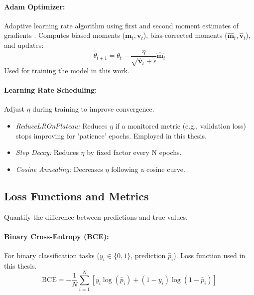 \begin{appendices}
  \paragraph{Adam Optimizer:}
  Adaptive learning rate algorithm using first and second moment estimates of gradients \autocite{kingma2014adam}. Computes biased moments (\( \bm{m}_t, \bm{v}_t \)), bias-corrected moments (\( \hat{\bm{m}}_t, \hat{\bm{v}}_t \)), and updates:
  \begin{equation}
    \theta_{t+1} = \theta_t - \frac{\eta}{\sqrt{\hat{\bm{v}}_t} + \epsilon} \hat{\bm{m}}_t
    \label{eq:adam-update} %
  \end{equation}
  Used for training the model in this work.

  \paragraph{Learning Rate Scheduling:}
  Adjust \( \eta \) during training to improve convergence.
  \begin{itemize}
    \item \textit{ReduceLROnPlateau:} Reduces \( \eta \) if a monitored metric (e.g., validation loss) stops improving for 'patience' epochs. Employed in this thesis.
    \item \textit{Step Decay:} Reduces \( \eta \) by fixed factor every N epochs.
    \item \textit{Cosine Annealing:} Decreases \( \eta \) following a cosine curve.
  \end{itemize}

  \subsection{Loss Functions and Metrics}
  \label{subsec:loss_metrics_app} %
  Quantify the difference between predictions and true values.

  \paragraph{Binary Cross-Entropy (BCE):}
  \label{eq:bce} %
  For binary classification tasks ($y_i \in \{0, 1\}$, prediction $\hat{p}_i$). Loss function used in this thesis.
  \begin{equation}
    \text{BCE} = -\frac{1}{N} \sum_{i=1}^N [ y_i \log(\hat{p}_i) + (1 - y_i) \log(1 - \hat{p}_i) ]
  \end{equation}


\end{appendices}
